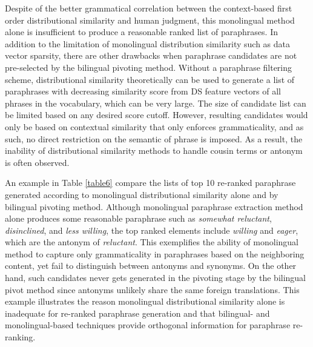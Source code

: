 \documentclass[11pt]{article}
\begin{document}
{{Despite of the better grammatical correlation between the context-based first order distributional similarity and human judgment, this monolingual method alone is insufficient to produce a reasonable ranked list of paraphrases. In addition to the limitation of monolingual distribution similarity such as data vector sparsity, there are other drawbacks when paraphrase candidates are not pre-selected by the bilingual pivoting method. Without a paraphrase filtering scheme, distributional similarity theoretically can be used to generate a list of paraphrases with decreasing similarity score from DS feature vectors of all phrases in the vocabulary, which can be very large. The size of candidate list can be limited based on any desired score cutoff. However, resulting candidates would only be based on contextual similarity that only enforces grammaticality, and as such, no direct restriction on the semantic of phrase is imposed. As a result, the inability of distributional similarity methods to handle cousin terms or antonym is often observed. 

An example in Table \ref{table6} compare the lists of top 10 re-ranked paraphrase generated according to monolingual distributional similarity alone and by bilingual pivoting method. Although monolingual paraphrase extraction method alone produces some reasonable paraphrase such as \emph{somewhat reluctant}, \emph{disinclined}, and \emph{less willing}, the top ranked elements include \emph{willing} and \emph{eager}, which are the antonym of \emph{reluctant}. This exemplifies the ability of monolingual method to capture only grammaticality in paraphrases based on the neighboring content, yet fail to distinguish between antonyms and synonyms. On the other hand, such candidates never gets generated in the pivoting stage by the bilingual pivot method since antonyms unlikely share the same foreign translations. This example illustrates the reason monolingual distributional similarity alone is inadequate for re-ranked paraphrase generation and that bilingual- and monolingual-based techniques provide orthogonal information for paraphrase re-ranking. 

}}
\end{document}
